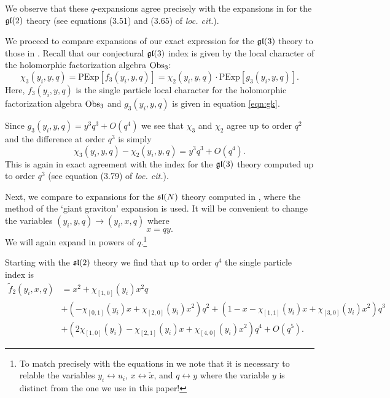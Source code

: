 We observe that these $q$-expansions agree precisely with the expansions in \cite{Kim:2013nva} for the $\mathfrak{gl}(2)$ theory  
(see equations (3.51) and (3.65) of \textit{loc. cit.}).

\parsec

We proceed to compare expansions of our exact expression for the $\mathfrak{gl}(3)$ theory to those in \cite{Kim:2013nva}. 
Recall that our conjectural $\mathfrak{gl}(3)$ index is given by the local character of the holomorphic factorization algebra $\text{Obs}_3$:
\begin{equation}
\chi_3 (y_i,y,q) = \text{PExp}[f_3(y_i,y,q)] = \chi_2(y_i,y,q) \cdot \text{PExp}[g_3(y_i,y,q)]  .
\end{equation}
Here, $f_3(y_i,y,q)$ is the single particle local character for the holomorphic factorization algebra $\text{Obs}_3$ and $g_3(y_i,y,q)$ is given in equation \eqref{eqn:gk}. 

Since $g_3(y_i,y,q) = y^3 q^3 + O(q^4)$ we see that $\chi_3$ and $\chi_2$ agree up to order $q^2$ and the difference at order $q^3$ is simply
\begin{equation}
\chi_3(y_i,y,q) - \chi_2(y_i,y,q) = y^3q^3 + O(q^4) .
\end{equation}
This is again in exact agreement with the index for the $\mathfrak{gl}(3)$ theory computed \cite{Kim:2013nva} up to order $q^3$ (see equation (3.79) of \textit{loc. cit.}). 

\parsec

Next, we compare to expansions for the $\mathfrak{sl}(N)$ theory computed in \cite{Imamura}, where the method of the `giant graviton' expansion is used.
It will be convenient to change the variables $(y_i, y, q) \to (y_i,x,q)$ where 
\begin{equation}
x = qy .
\end{equation} 
We will again expand in powers of $q$.\footnote{To match precisely with the equations in \cite{Imamura} we note that it is necessary to relable the variables $y_i \leftrightarrow u_i$, $x \leftrightarrow \check{x}$, and $q \leftrightarrow y$ where the variable $y$ is distinct from the one we use in this paper!}

Starting with the $\mathfrak{sl}(2)$ theory we find that up to order $q^4$ the single particle index is
\begin{align*}
\tilde f_2 (y_i,x,q) & = x^2 + \chi_{[1,0]}(y_i) x^2 q \\
& + \left(-\chi_{[0,1]}(y_i) x + \chi_{[2,0]}(y_i) x^2 \right) q^2 +  \left(1-x-\chi_{[1,1]}(y_i) x + \chi_{[3,0]}(y_i) x^2 \right) q^3 \\
& + \left(2 \chi_{[1,0]}(y_i) - \chi_{[2,1]}(y_i) x + \chi_{[4,0]}(y_i)x^2 \right)q^4 + O(q^5) .
\end{align*}


